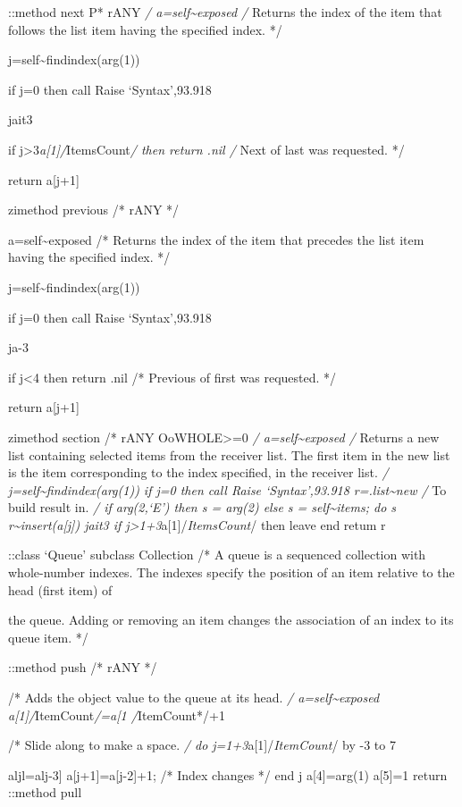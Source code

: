 ::method next P* rANY \emph{/ a=self\textasciitilde exposed /} Returns
the index of the item that follows the list item having the specified
index. */

j=self\textasciitilde findindex(arg(1))

if j=0 then call Raise `Syntax',93.918

jait3

if j\textgreater3\emph{a{[}1{]}/}ItemsCount\emph{/ then return .nil /}
Next of last was requested. */

return a{[}j+1{]}

zimethod previous /* rANY */

a=self\textasciitilde exposed /* Returns the index of the item that
precedes the list item having the specified index. */

j=self\textasciitilde findindex(arg(1))

if j=0 then call Raise `Syntax',93.918

ja-3

if j\textless4 then return .nil /* Previous of first was requested. */

return a{[}j+1{]}

zimethod section /* rANY OoWHOLE\textgreater=0 \emph{/
a=self\textasciitilde exposed /} Returns a new list containing selected
items from the receiver list. The first item in the new list is the item
corresponding to the index specified, in the receiver list. \emph{/
j=self\textasciitilde findindex(arg(1)) if j=0 then call Raise
`Syntax',93.918 r=.list\textasciitilde new /} To build result in.
\emph{/ if arg(2,`E') then s = arg(2) else s =
self\textasciitilde items; do s r\textasciitilde insert(a{[}j{]}) jait3
if j\textgreater1+3}a{[}1{]}/\emph{ItemsCount}/ then leave end retum r

::class `Queue' subclass Collection /* A queue is a sequenced collection
with whole-number indexes. The indexes specify the position of an item
relative to the head (first item) of

the queue. Adding or removing an item changes the association of an
index to its queue item. */

::method push /* rANY */

/* Adds the object value to the queue at its head. \emph{/
a=self\textasciitilde exposed a{[}1{]}/}ItemCount\emph{/=a{[}1
\textbar/}ItemCount*/+1

/* Slide along to make a space. \emph{/ do
j=1+3}a{[}1{]}/\emph{ItemCount}/ by -3 to 7

aljl=alj-3{]} a{[}j+1{]}=a{[}j-2{]}+1; /* Index changes */ end j
a{[}4{]}=arg(1) a{[}5{]}=1 return ::method pull

